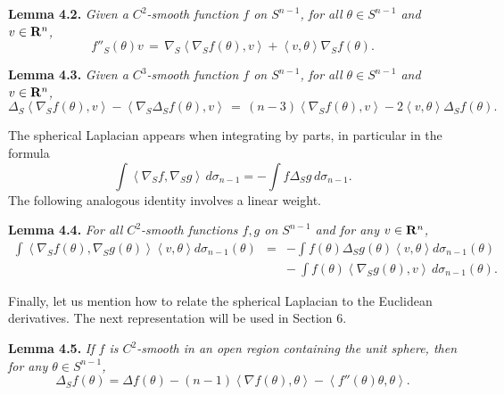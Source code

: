 \documentclass[reqno,12pt]{amsart}
\theoremstyle{plain}
\begin{document}
\vskip5mm
{\bf Lemma 4.2.} {\it Given a $C^2$-smooth function $f$ on $S^{n-1}$,
for all $\theta \in S^{n-1}$ and $v \in {{\bf R}}^n$,
\begin{equation}
f''_S(\theta) v \, = \, \nabla_S \left<\nabla_S f(\theta),v\right> + 
\left<v,\theta\right> \nabla_S f(\theta).
\end{equation}
}

\vskip2mm
{\bf Lemma 4.3.} {\it Given a $C^3$-smooth function $f$ on $S^{n-1}$,
for all $\theta \in S^{n-1}$ and $v \in {{\bf R}}^n$, 
$$
\Delta_S \left<\nabla_S f(\theta),v\right> - 
\left<\nabla_S \Delta_S f(\theta),v\right> \, = \,  
(n-3)\left<\nabla_S f(\theta),v\right> - 2\left<v,\theta\right>
\Delta_S f(\theta).
$$
}

The spherical Laplacian appears when integrating by parts,
in particular in the formula
\begin{equation}
\int \left<\nabla_S f,\nabla_S g\right>\,d\sigma_{n-1} = -
\int f \Delta_S g\,d\sigma_{n-1}.
\end{equation}
The following analogous identity involves a linear weight.

\vskip5mm
{\bf Lemma 4.4.} {\it For all $C^2$-smooth functions $f, g$ on 
$S^{n-1}$ and for any $v \in {{\bf R}}^n$, 
\begin{eqnarray*}
\int \left<\nabla_S f(\theta),\nabla_S g(\theta)\right>\left<v,\theta\right> 
d\sigma_{n-1}(\theta)
 & = &
-
\int f(\theta)\Delta_S g(\theta)\left<v,\theta\right> d\sigma_{n-1}(\theta) \\
 & & - \ 
\int f(\theta)\left<\nabla_S g(\theta),v\right>\,d\sigma_{n-1}(\theta).
\end{eqnarray*}
}

Finally, let us mention how to relate the spherical 
Laplacian to the Euclidean derivatives. The next representation will be
used in Section 6.

\vskip5mm
{\bf Lemma 4.5.} {\it If $f$ is $C^2$-smooth in an open region containing 
the unit sphere, then for any $\theta \in S^{n-1}$, 
$$
\Delta_S f(\theta) = \Delta f(\theta) - 
(n-1) \left<\nabla f(\theta),\theta\right> 
- \left<f''(\theta)\theta,\theta\right>.
$$
}
\end{document}
